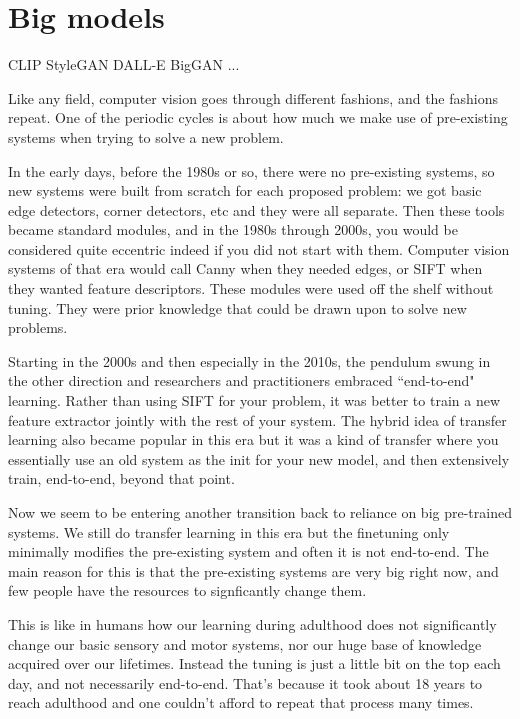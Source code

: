 \chapter{Big models}

CLIP
StyleGAN
DALL-E
BigGAN
...

Like any field, computer vision goes through different fashions, and the fashions repeat. One of the periodic cycles is about how much we make use of pre-existing systems when trying to solve a new problem.

In the early days, before the 1980s or so, there were no pre-existing systems, so new systems were built from scratch for each proposed problem: we got basic edge detectors, corner detectors, etc and they were all separate. Then these tools became standard modules, and in the 1980s through 2000s, you would be considered quite eccentric indeed if you did not start with them. Computer vision systems of that era would call Canny when they needed edges, or SIFT when they wanted feature descriptors. These modules were used off the shelf without tuning. They were prior knowledge that could be drawn upon to solve new problems.

Starting in the 2000s and then especially in the 2010s, the pendulum swung in the other direction and researchers and practitioners embraced ``end-to-end" learning. Rather than using SIFT for your problem, it was better to train a new feature extractor jointly with the rest of your system. The hybrid idea of transfer learning also became popular in this era but it was a kind of transfer where you essentially use an old system as the init for your new model, and then extensively train, end-to-end, beyond that point.

Now we seem to be entering another transition back to reliance on big pre-trained systems. We still do transfer learning in this era but the finetuning only minimally modifies the pre-existing system and often it is not end-to-end. The main reason for this is that the pre-existing systems are very big right now, and few people have the resources to signficantly change them.

This is like in humans how our learning during adulthood does not significantly change our basic sensory and motor systems, nor our huge base of knowledge acquired over our lifetimes. Instead the tuning is just a little bit on the top each day, and not necessarily end-to-end. That's because it took about 18 years to reach adulthood and one couldn't afford to repeat that process many times.

